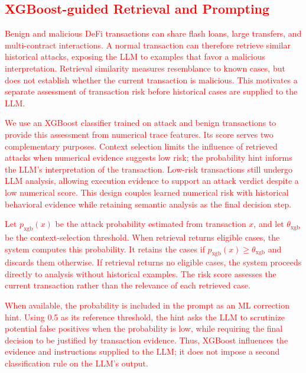 \subsection{\textcolor{red}{XGBoost-guided Retrieval and Prompting}}
\label{sec:xgb-guidance}

\textcolor{red}{Benign and malicious DeFi transactions can share flash loans, large transfers, and multi-contract interactions. A normal transaction can therefore retrieve similar historical attacks, exposing the LLM to examples that favor a malicious interpretation. Retrieval similarity measures resemblance to known cases, but does not establish whether the current transaction is malicious. This motivates a separate assessment of transaction risk before historical cases are supplied to the LLM.}

\textcolor{red}{We use an XGBoost classifier trained on attack and benign transactions to provide this assessment from numerical trace features. Its score serves two complementary purposes. Context selection limits the influence of retrieved attacks when numerical evidence suggests low risk; the probability hint informs the LLM's interpretation of the transaction. Low-risk transactions still undergo LLM analysis, allowing execution evidence to support an attack verdict despite a low numerical score. This design couples learned numerical risk with historical behavioral evidence while retaining semantic analysis as the final decision step.}

\textcolor{red}{Let $p_{\mathrm{xgb}}(x)$ be the attack probability estimated from transaction $x$, and let $\theta_{\mathrm{xgb}}$ be the context-selection threshold. When retrieval returns eligible cases, the system computes this probability. It retains the cases if $p_{\mathrm{xgb}}(x)\geq\theta_{\mathrm{xgb}}$ and discards them otherwise. If retrieval returns no eligible cases, the system proceeds directly to analysis without historical examples. The risk score assesses the current transaction rather than the relevance of each retrieved case.}

\textcolor{red}{When available, the probability is included in the prompt as an ML correction hint. Using 0.5 as its reference threshold, the hint asks the LLM to scrutinize potential false positives when the probability is low, while requiring the final decision to be justified by transaction evidence. Thus, XGBoost influences the evidence and instructions supplied to the LLM; it does not impose a second classification rule on the LLM's output.}

